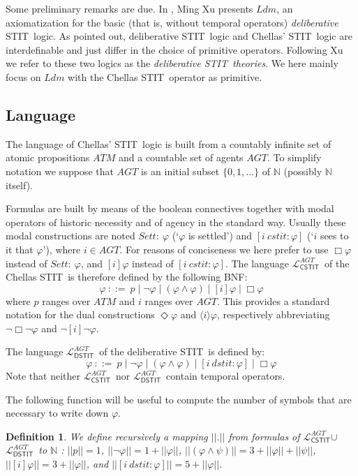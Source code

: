 \documentclass{article}
\newtheorem{definition}{Definition}
\renewcommand{\phi}{\varphi}
\newcommand{\lngth}[1]{|\!|#1|\!|}
\newcommand{\cstit}[1]{[{#1}]}           \newcommand{\poscstit}[1]{\langle {#1} \rangle}    \newcommand{\dstit}[2]{[{#1}\ \mathit{dstit}\! :{#2}]}
\newcommand{\atmset}{\ensuremath{\mathit{ATM}}}        \newcommand{\actset}{\ensuremath{\mathit{ACT}}}        \newcommand{\evtset}{\ensuremath{\mathit{EVT}}}
\newcommand{\agtset}{\ensuremath{\mathit{AGT}}}
\newcommand{\STIT} {{\textsf{STIT}}}              \newcommand{\CSTIT}{{\textsf{CSTIT}}}            \newcommand{\DSTIT}{{\textsf{DSTIT}}}
\newcommand{\LCSTIT}{$\mathcal{L}_{\mathsf{CSTIT}}^\agtset$}
\newcommand{\LDSTIT}{$\mathcal{L}_{\mathsf{DSTIT}}^\agtset$}
\begin{document}
Some preliminary remarks are due. In \cite[Chap.\ 17]{belnap01facing},
Ming Xu presents $Ldm$, an axiomatization for the basic
(that is, without temporal operators) \emph{deliberative} \STIT\ logic.
As pointed out, deliberative \STIT\ logic and Chellas' \STIT\ logic are
interdefinable and just differ in the choice of primitive operators.
Following Xu we refer to these two logics as the
\emph{deliberative \STIT\ theories}.
We here mainly focus on $Ldm$ with the Chellas \STIT\ operator as
primitive.

\subsection{Language}
The language of Chellas' \STIT\ logic is built from
a countably infinite set of atomic propositions $\atmset$ and
a countable set of agents $\agtset$.
To simplify notation we suppose that $\agtset $ is an initial subset
$\{0,1,\ldots\}$ of $\mathbb{N}$ (possibly $\mathbb{N}$ itself).

Formulas are built by means of the boolean connectives together
with modal operators of historic necessity and of agency in the standard way.
Usually these modal constructions are noted
$\mathit{Sett:}\ \phi $ (`$\phi$ is settled') and
$[i\ \mathit{cstit}\! :\phi]$ (`$i$ sees to it that $\phi$'),
where
$i \in \agtset$. For reasons of conciseness we here prefer to use
$\Box \phi$ instead of $\mathit{Sett:}\ \phi $,
and $\cstit{i} \phi $
instead of $[i\ \mathit{cstit}\! :\phi]$.
The language \LCSTIT\ of the Chellas \STIT\ is therefore defined by the following BNF:
$$\phi \ ::=\ p \mid \lnot \phi \mid (\phi \land \phi)
              \mid \cstit{i}\phi \mid \Box\phi$$
where $p$ ranges over $\atmset$ and $i$ ranges over $\agtset$.
This provides a standard notation for the dual constructions
$\Diamond \phi$ and $\poscstit{i} \phi $, respectively abbreviating
$\lnot \Box \lnot \phi$ and $\lnot \cstit{i} \lnot \phi $.

The language \LDSTIT\ of the deliberative \STIT\ is defined by:
$$\phi \ ::=\ p \mid \lnot \phi \mid (\phi \land \phi)
              \mid \dstit{i}\phi \mid \Box\phi$$
Note that neither \LCSTIT\ nor \LDSTIT\ contain temporal operators.

The following function will be useful to compute
the number of symbols that are necessary to write down $\phi$.

\begin{definition}
We define recursively a mapping $\lngth{.}$ from formulas of \LCSTIT $\cup$ \LDSTIT\
to $\mathbb{N}$ :
$\lngth{p}                 = 1              $,
$\lngth{\lnot\phi}         = 1+\lngth{\phi} $,
$\lngth{(\phi \land \psi)} = 3 + \lngth{\phi} + \lngth{\psi}$,
$\lngth{\cstit{i}\phi}   = 3 + \lngth{\phi}$, and
$\lngth{\dstit{i}{\phi}} = 5 + \lngth{\phi}$.
\end{definition}
\end{document}
